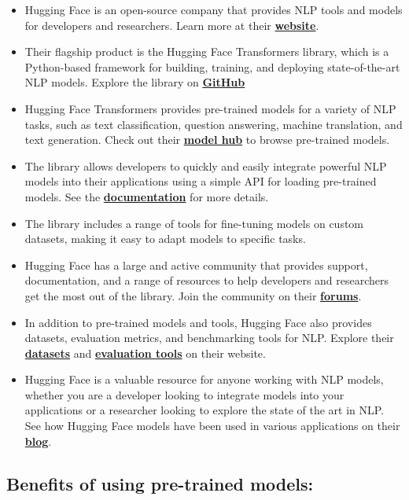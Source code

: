 \begin{itemize}
    \item Hugging Face is an open-source company that provides NLP tools and models for developers and researchers. Learn more at their \href{https://huggingface.co/}{\textbf{website}}.
    \item Their flagship product is the Hugging Face Transformers library, which is a Python-based framework for building, training, and deploying state-of-the-art NLP models. Explore the library on \href{https://github.com/huggingface/transformers}{\textbf{GitHub}}
    \item Hugging Face Transformers provides pre-trained models for a variety of NLP tasks, such as text classification, question answering, machine translation, and text generation. Check out their \href{https://huggingface.co/models}{\textbf{model hub}} to browse pre-trained models.
    \item The library allows developers to quickly and easily integrate powerful NLP models into their applications using a simple API for loading pre-trained models. See the \href{https://huggingface.co/transformers/main_classes/pipelines.html}{\textbf{documentation}} for more details.
    \item The library includes a range of tools for fine-tuning models on custom datasets, making it easy to adapt models to specific tasks.
    \item Hugging Face has a large and active community that provides support, documentation, and a range of resources to help developers and researchers get the most out of the library. Join the community on their \href{https://discuss.huggingface.co/}{\textbf{forums}}.
    \item In addition to pre-trained models and tools, Hugging Face also provides datasets, evaluation metrics, and benchmarking tools for NLP. Explore their \href{https://huggingface.co/datasets}{\textbf{datasets}} and \href{https://huggingface.co/metrics}{\textbf{evaluation tools}} on their website.
    \item Hugging Face is a valuable resource for anyone working with NLP models, whether you are a developer looking to integrate models into your applications or a researcher looking to explore the state of the art in NLP. See how Hugging Face models have been used in various applications on their \href{https://huggingface.co/blog}{\textbf{blog}}.
\end{itemize}

\subsection{Benefits of using pre-trained models:}

